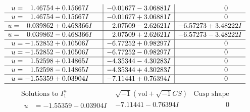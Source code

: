 \documentclass[1p]{elsarticle_modified}
\theoremstyle{definition}
\newcommand{\I}{\sqrt{-1}}
\begin{document}
$$\begin{array}{c|c|c}
\begin{aligned}
u &= \phantom{-}1.46754 + 0.15667 I\end{aligned}
 & -0.01677 - 3.06881 I & \phantom{-0.000000 } 0 \\ \hline\begin{aligned}
u &= \phantom{-}1.46754 - 0.15667 I\end{aligned}
 & -0.01677 + 3.06881 I & \phantom{-0.000000 } 0 \\ \hline\begin{aligned}
u &= \phantom{-}0.039862 + 0.468366 I\end{aligned}
 & \phantom{-}2.07509 - 2.62621 I & -6.57273 + 3.48222 I \\ \hline\begin{aligned}
u &= \phantom{-}0.039862 - 0.468366 I\end{aligned}
 & \phantom{-}2.07509 + 2.62621 I & -6.57273 - 3.48222 I \\ \hline\begin{aligned}
u &= -1.52852 + 0.10506 I\end{aligned}
 & -6.77252 + 0.98297 I & \phantom{-0.000000 } 0 \\ \hline\begin{aligned}
u &= -1.52852 - 0.10506 I\end{aligned}
 & -6.77252 - 0.98297 I & \phantom{-0.000000 } 0 \\ \hline\begin{aligned}
u &= \phantom{-}1.52598 + 0.14865 I\end{aligned}
 & -4.35344 - 4.30283 I & \phantom{-0.000000 } 0 \\ \hline\begin{aligned}
u &= \phantom{-}1.52598 - 0.14865 I\end{aligned}
 & -4.35344 + 4.30283 I & \phantom{-0.000000 } 0 \\ \hline\begin{aligned}
u &= -1.55359 + 0.03904 I\end{aligned}
 & -7.11441 + 0.76394 I & \phantom{-0.000000 } 0\\
 \hline 
 \end{array}$$\newpage$$\begin{array}{c|c|c}  
\text{Solutions to }I^u_{1}& \I (\text{vol} + \sqrt{-1}CS) & \text{Cusp shape}\\
 \hline 
\begin{aligned}
u &= -1.55359 - 0.03904 I\end{aligned}
 & -7.11441 - 0.76394 I & \phantom{-0.000000 } 0 \\ \hline\begin{aligned}

\end{aligned}
\end{array}$$
\end{document}
